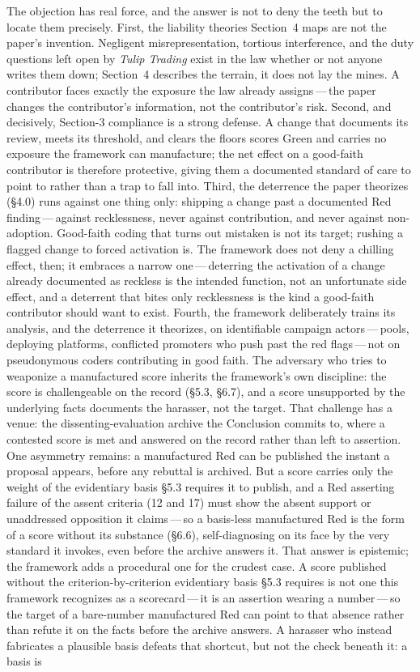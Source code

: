 \documentclass[11pt, twoside, openright]{book}
\newcommand{\sect}[1]{\S#1}
\begin{document}
The objection has real force, and the answer is not to deny the teeth but to locate them precisely. First, the liability theories Section~4 maps are not the paper's invention. Negligent misrepresentation, tortious interference, and the duty questions left open by \textit{Tulip Trading} exist in the law whether or not anyone writes them down; Section~4 describes the terrain, it does not lay the mines. A contributor faces exactly the exposure the law already assigns\,---\,the paper changes the contributor's information, not the contributor's risk. Second, and decisively, Section-3 compliance is a strong defense. A change that documents its review, meets its threshold, and clears the floors scores Green and carries no exposure the framework can manufacture; the net effect on a good-faith contributor is therefore protective, giving them a documented standard of care to point to rather than a trap to fall into. Third, the deterrence the paper theorizes (\sect{4.0}) runs against one thing only: shipping a change past a documented Red finding\,---\,against recklessness, never against contribution, and never against non-adoption. Good-faith coding that turns out mistaken is not its target; rushing a flagged change to forced activation is. The framework does not deny a chilling effect, then; it embraces a narrow one\,---\,deterring the activation of a change already documented as reckless is the intended function, not an unfortunate side effect, and a deterrent that bites only recklessness is the kind a good-faith contributor should want to exist. Fourth, the framework deliberately trains its analysis, and the deterrence it theorizes, on identifiable campaign actors\,---\,pools, deploying platforms, conflicted promoters who push past the red flags\,---\,not on pseudonymous coders contributing in good faith. The adversary who tries to weaponize a manufactured score inherits the framework's own discipline: the score is challengeable on the record (\sect{5.3}, \sect{6.7}), and a score unsupported by the underlying facts documents the harasser, not the target. That challenge has a venue: the dissenting-evaluation archive the Conclusion commits to, where a contested score is met and answered on the record rather than left to assertion. One asymmetry remains: a manufactured Red can be published the instant a proposal appears, before any rebuttal is archived. But a score carries only the weight of the evidentiary basis \sect{5.3} requires it to publish, and a Red asserting failure of the assent criteria (12 and 17) must show the absent support or unaddressed opposition it claims\,---\,so a basis-less manufactured Red is the form of a score without its substance (\sect{6.6}), self-diagnosing on its face by the very standard it invokes, even before the archive answers it. That answer is epistemic; the framework adds a procedural one for the crudest case. A score published without the criterion-by-criterion evidentiary basis \sect{5.3} requires is not one this framework recognizes as a scorecard\,---\,it is an assertion wearing a number\,---\,so the target of a bare-number manufactured Red can point to that absence rather than refute it on the facts before the archive answers. A harasser who instead fabricates a plausible basis defeats that shortcut, but not the check beneath it: a basis is 
\end{document}
